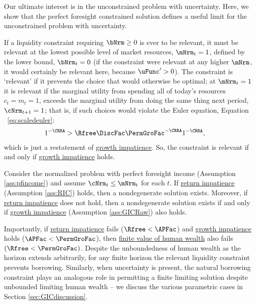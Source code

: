 \documentclass[BufferStockTheory]{subfiles}
\begin{document}
Our ultimate interest is in the unconstrained problem with uncertainty.  Here, we show that the perfect foresight constrained solution defines a useful limit for the unconstrained problem with uncertainty.

If a liquidity constraint requiring $\bNrm \geq 0$ is ever to be relevant, it must be relevant at the lowest possible level of market resources, $\mNrm_{t}=1$, defined by the lower bound, $\bNrm_{t}=0$ (if the constraint were relevant at any higher $\mNrm$, it would certainly be relevant here, because $\uFunc^{\prime}>0$).  The constraint is `relevant' if it prevents the choice that would otherwise be optimal; at $\mNrm_{t}=1$ it is relevant if the marginal utility from spending all of today's resources $c_{t}=m_{t}=1$, exceeds the marginal utility from doing the same thing next period, $\cNrm_{t+1}=1$; that is, if such choices would violate the Euler equation, Equation ~\eqref{eq:scaledeuler}:
\begin{align}
  1^{-\CRRA}  & > \Rfree \DiscFac \PermGroFac^{-\CRRA}1^{-\CRRA},  \label{eq:LiqConstrBinds}
\end{align}
which is just a restatement of \hyperlink{GRICRaw}{growth impatience}. So, the constraint is relevant if and only if \hyperlink{GICRaw}{growth impatience} holds. 

\begin{proposition}\label{prop:PFCExist}
Consider the normalized problem with perfect foresight income (Assumption \ref{ass:pfincome}) and assume $\cNrm_{t}\leq \mNrm_{t}$ for each $t$. If \hyperlink{RIC}{return impatience} (Assumption \ref{ass:RIC}) holds, then a nondegenerate solution exists. Moreover, if \hyperlink{RIC}{return impatience} does not hold, then a nondegenerate solution exists if and only if \hyperlink{GICRaw}{growth impatience} (Assumption \ref{ass:GICRaw}) also holds. 
\end{proposition}

Importantly, if \hyperlink{RIC}{return impatience} fails ($\Rfree<\APFac$) and \hyperlink{GRICRaw}{growth impatience} holds ($\APFac<\PermGroFac$), then \hyperlink{FHWC}{finite value of human wealth} also fails $(\Rfree < \PermGroFac)$.  Despite the unboundedness of human wealth as the horizon extends arbitrarily, for any finite horizon the relevant liquidity constraint prevents borrowing. Similarly, when uncertainty is present, the natural borrowing constraint plays an analogous role in permitting a finite limiting solution despite unbounded limiting human wealth -- we discuss the various parametric cases in Section \ref{sec:GICdiscussion}. 
\end{document}
